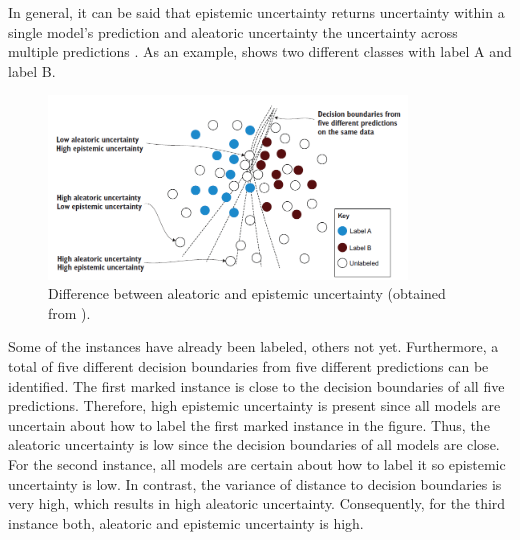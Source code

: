 In general, it can be said that epistemic uncertainty returns uncertainty within a single model's prediction and aleatoric uncertainty the uncertainty across multiple predictions \cite{human-in-the-loop}.
As an example,  shows two different classes with label A and label B.
\begin{figure}[H]
  \centering
    \includegraphics[width=0.85\textwidth]{figures/uncertainty_differences.PNG}
  \caption{Difference between aleatoric and epistemic uncertainty (obtained from \cite{human-in-the-loop}).}
  \label{fig:differences_aleatoric_epistemic}
\end{figure}
Some of the instances have already been labeled, others not yet.
Furthermore, a total of five different decision boundaries from five different predictions can be identified.
The first marked instance is close to the decision boundaries of all five predictions.
Therefore, high epistemic uncertainty is present since all models are uncertain about how to label the first marked instance in the figure.
Thus, the aleatoric uncertainty is low since the decision boundaries of all models are close.
For the second instance, all models are certain about how to label it so epistemic uncertainty is low.
In contrast, the variance of distance to decision boundaries is very high, which results in high aleatoric uncertainty.
Consequently, for the third instance both, aleatoric and epistemic uncertainty is high.
